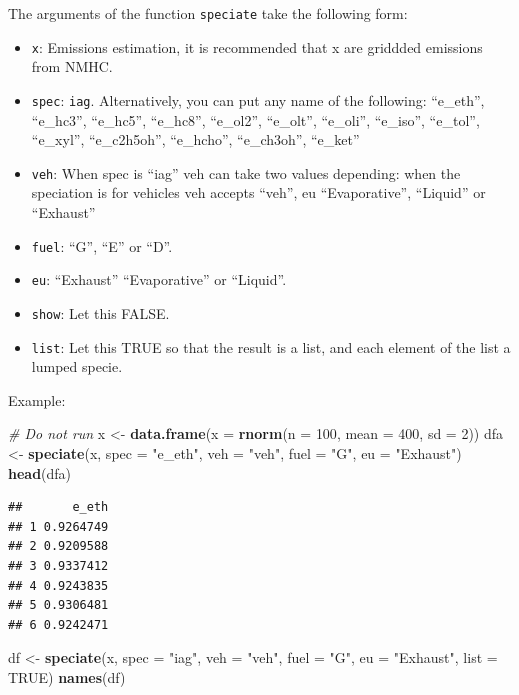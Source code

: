 \documentclass[12pt,graybox,envcountchap,sectrefs]{krantz}
\makeatletter
\newenvironment{Shaded}{\begin{snugshade}}{\end{snugshade}}
\newcommand{\KeywordTok}[1]{\textcolor[rgb]{0.13,0.29,0.53}{\textbf{#1}}}
\newcommand{\DataTypeTok}[1]{\textcolor[rgb]{0.13,0.29,0.53}{#1}}
\newcommand{\DecValTok}[1]{\textcolor[rgb]{0.00,0.00,0.81}{#1}}
\newcommand{\StringTok}[1]{\textcolor[rgb]{0.31,0.60,0.02}{#1}}
\newcommand{\CommentTok}[1]{\textcolor[rgb]{0.56,0.35,0.01}{\textit{#1}}}
\newcommand{\OtherTok}[1]{\textcolor[rgb]{0.56,0.35,0.01}{#1}}
\newcommand{\NormalTok}[1]{#1}
\providecommand{\tightlist}{%
  \setlength{\itemsep}{0pt}\setlength{\parskip}{0pt}}
\newenvironment{kframe}{%
\medskip{}
\setlength{\fboxsep}{.8em}
 \def\at@end@of@kframe{}%
 \ifinner\ifhmode%
  \def\at@end@of@kframe{\end{minipage}}%
  \begin{minipage}{\columnwidth}%
 \fi\fi%
 \def\FrameCommand##1{\hskip\@totalleftmargin \hskip-\fboxsep
 \colorbox{shadecolor}{##1}\hskip-\fboxsep
     \hskip-\linewidth \hskip-\@totalleftmargin \hskip\columnwidth}%
 \MakeFramed {\advance\hsize-\width
   \@totalleftmargin\z@ \linewidth\hsize
   \@setminipage}}%
 {\par\unskip\endMakeFramed%
 \at@end@of@kframe}
\renewenvironment{Shaded}{\begin{kframe}}{\end{kframe}}
\theoremstyle{definition}
\theoremstyle{definition}
\theoremstyle{definition}
\theoremstyle{remark}
\makeatother
\begin{document}
The arguments of the function \texttt{speciate} take the following form:

\begin{itemize}
\tightlist
\item
  \texttt{x}: Emissions estimation, it is recommended that x are
  griddded emissions from NMHC.
\item
  \texttt{spec}: \texttt{iag}. Alternatively, you can put any name of
  the following: ``e\_eth'', ``e\_hc3'', ``e\_hc5'', ``e\_hc8'',
  ``e\_ol2'', ``e\_olt'', ``e\_oli'', ``e\_iso'', ``e\_tol'',
  ``e\_xyl'', ``e\_c2h5oh'', ``e\_hcho'', ``e\_ch3oh'', ``e\_ket''
\item
  \texttt{veh}: When spec is ``iag'' veh can take two values depending:
  when the speciation is for vehicles veh accepts ``veh'', eu
  ``Evaporative'', ``Liquid'' or ``Exhaust''
\item
  \texttt{fuel}: ``G'', ``E'' or ``D''.
\item
  \texttt{eu}: ``Exhaust'' ``Evaporative'' or ``Liquid''.
\item
  \texttt{show}: Let this FALSE.
\item
  \texttt{list}: Let this TRUE so that the result is a list, and each
  element of the list a lumped specie.
\end{itemize}

Example:

\begin{Shaded}
\begin{Highlighting}[]
\CommentTok{# Do not run}
\NormalTok{x <-}\StringTok{ }\KeywordTok{data.frame}\NormalTok{(}\DataTypeTok{x =} \KeywordTok{rnorm}\NormalTok{(}\DataTypeTok{n =} \DecValTok{100}\NormalTok{, }\DataTypeTok{mean =} \DecValTok{400}\NormalTok{, }\DataTypeTok{sd =} \DecValTok{2}\NormalTok{))}
\NormalTok{dfa <-}\StringTok{ }\KeywordTok{speciate}\NormalTok{(x, }\DataTypeTok{spec =} \StringTok{"e_eth"}\NormalTok{, }\DataTypeTok{veh =} \StringTok{"veh"}\NormalTok{, }\DataTypeTok{fuel =} \StringTok{"G"}\NormalTok{, }\DataTypeTok{eu =} \StringTok{"Exhaust"}\NormalTok{)}
\KeywordTok{head}\NormalTok{(dfa)}
\end{Highlighting}
\end{Shaded}

\begin{verbatim}
##       e_eth
## 1 0.9264749
## 2 0.9209588
## 3 0.9337412
## 4 0.9243835
## 5 0.9306481
## 6 0.9242471
\end{verbatim}

\begin{Shaded}
\begin{Highlighting}[]
\NormalTok{df <-}\StringTok{ }\KeywordTok{speciate}\NormalTok{(x, }\DataTypeTok{spec =} \StringTok{"iag"}\NormalTok{, }\DataTypeTok{veh =} \StringTok{"veh"}\NormalTok{, }\DataTypeTok{fuel =} \StringTok{"G"}\NormalTok{,}
               \DataTypeTok{eu =} \StringTok{"Exhaust"}\NormalTok{, }\DataTypeTok{list =} \OtherTok{TRUE}\NormalTok{)}
\KeywordTok{names}\NormalTok{(df)}
\end{Highlighting}
\end{Shaded}
\end{document}

